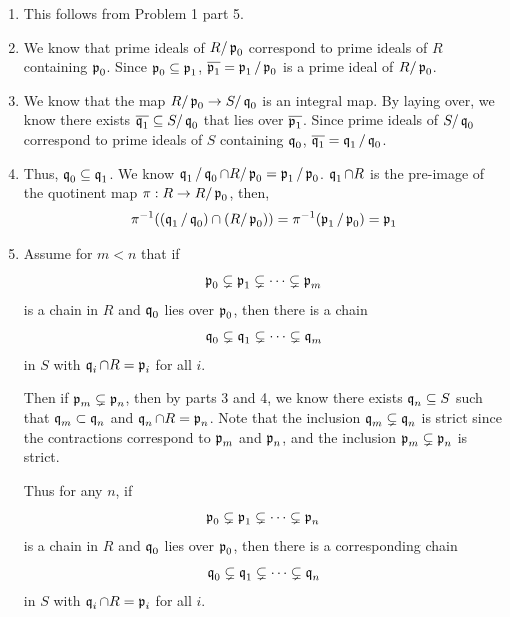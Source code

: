 \documentclass[Notebook.tex]{subfiles}
\begin{document}
\begin{solution}
    \bbni 
    \begin{enumerate}
        \item This follows from Problem 1 part 5. 
        \item We know that prime ideals of $R/\fp_0$ correspond to prime ideals of $R$ containing $\fp_0$. Since $\fp_0 \subseteq \fp_1$, $\overline{\fp_1} = \fp_1/\fp_0$ is a prime ideal of $R/\fp_0$. 
        \item We know that the map $R/\fp_0 \to S/\fq_0$ is an integral map. By laying over, we know there exists $\overline{\fq_1}\subseteq S/\fq_0$ that lies over $\overline{\fp_1}$. Since prime ideals of $S/\fq_0$ correspond to prime ideals of $S$ containing $\fq_0$, $\overline{\fq_1} = \fq_1/\fq_0$. 
        \item Thus, $\fq_0 \subseteq \fq_1$. We know $\fq_1/\fq_0 \cap R/\fp_0 =  \fp_1/\fp_0$. $\fq_1 \cap R$ is the pre-image of the quotinent map $\pi: R \to R/\fp_0$, then, 
        \[\pi^{-1} ((\fq_1/\fq_0) \cap (R/\fp_0)) =  \pi^{-1}(\fp_1/\fp_0) = \fp_1\]
        \item Assume for $m < n$ that if
        \[
        \fp_0\subsetneq \fp_1\subsetneq\cdots\subsetneq \fp_m
        \]
        is a chain in $R$ and $\fq_0$ lies over $\fp_0$, then there is a chain
        \[
        \fq_0\subsetneq \fq_1\subsetneq\cdots\subsetneq \fq_m
        \]
        in $S$ with $\fq_i\cap R=\fp_i$ for all $i$.
        
        Then if $\fp_m \subsetneq \fp_n$, then by parts 3 and 4, we know there exists $\fq_n \subseteq S$ such that $\fq_m \subset \fq_n$ and $\fq_n \cap R = \fp_n$. Note that the inclusion $\fq_m \subsetneq \fq_n$ is strict since the contractions correspond to $\fp_m$ and $\fp_n$, and the inclusion $\fp_m \subsetneq \fp_n$ is strict. 
        
        Thus for any $n$, if
        \[
        \fp_0\subsetneq \fp_1\subsetneq\cdots\subsetneq \fp_n
        \]
        is a chain in $R$ and $\fq_0$ lies over $\fp_0$, then there is a corresponding chain
        \[
        \fq_0\subsetneq \fq_1\subsetneq\cdots\subsetneq \fq_n
        \]
        in $S$ with $\fq_i\cap R=\fp_i$ for all $i$. 
    \end{enumerate}
\end{solution}

\newpage
\end{document}
